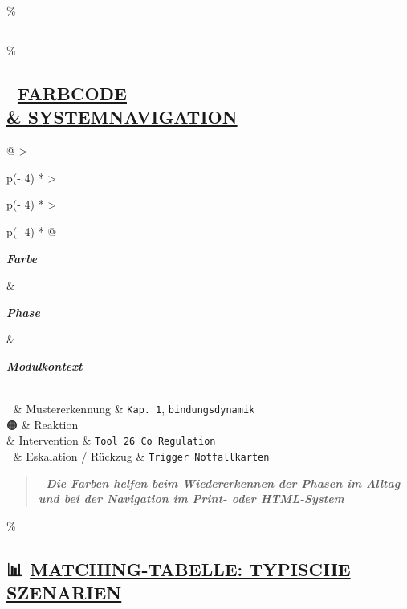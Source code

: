 \hypertarget{section-1}{\%
\subsection{}\label{section-1}}

\hypertarget{farbcode-systemnavigation}{\%
\subsection{\texorpdfstring{🎨 \textbf{\ul{FARBCODE \\& SYSTEMNAVIGATION}}}{🎨 FARBCODE \\& SYSTEMNAVIGATION}}\label{farbcode-systemnavigation}}

\begin{longtable}[]{@{}
  >{\raggedright\arraybackslash}p{(\columnwidth - 4\tabcolsep) * }
  >{\raggedright\arraybackslash}p{(\columnwidth - 4\tabcolsep) * }
  >{\raggedright\arraybackslash}p{(\columnwidth - 4\tabcolsep) * }@{}}
\toprule\noalign{}
\begin{minipage}[b]{\linewidth}\raggedright
\emph{\textbf{Farbe}}
\end{minipage} \& \begin{minipage}[b]{\linewidth}\raggedright
\emph{\textbf{Phase}}
\end{minipage} \& \begin{minipage}[b]{\linewidth}\raggedright
\emph{\textbf{Modulkontext}}
\end{minipage} \\
\midrule\noalign{}
\endhead
\bottomrule\noalign{}
\endlastfoot
🔵 \& Mustererkennung \& \texttt{Kap.\ }\texttt{1}, \texttt{bindungsdynamik} \\
🟠 \& Reaktion \\& Intervention \& \texttt{T}\texttt{ool}\texttt{\ }\texttt{26}\texttt{\ C}\texttt{o}\texttt{\ R}\texttt{egulation} \\
🔴 \& Eskalation / Rückzug \& \texttt{T}\texttt{rigger}\texttt{\ N}\texttt{otfallkarten} \\
\end{longtable}

\begin{quote}
\emph{\textbf{📎 Die Farben helfen beim Wiedererkennen der Phasen im Alltag und bei der Navigation im Print- oder HTML-System}}
\end{quote}

\hypertarget{matching-tabelle-typische-szenarien}{\%
\subsection{\texorpdfstring{📊 \textbf{\ul{MATCHING-TABELLE: TYPISCHE SZENARIEN}}}{📊 MATCHING-TABELLE: TYPISCHE SZENARIEN}}\label{matching-tabelle-typische-szenarien}}

